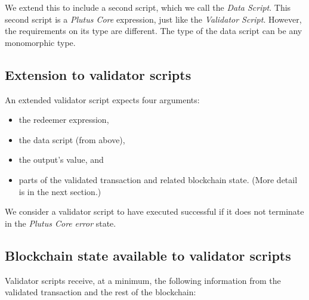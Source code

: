 \documentclass[11pt,a4paper]{article}
\begin{document}
We extend this to include a second script, which we call the \emph{Data Script}.
This second script is a \emph{Plutus Core} expression, just like the \emph{Validator Script}.
However, the requirements on its type are different.
The type of the data script can be any monomorphic type.

\subsection{Extension to validator scripts}

An extended validator script expects four arguments:

\begin{itemize}
\item the redeemer expression,
\item the data script (from above),
\item the output’s value, and
\item parts of the validated transaction and related blockchain state. (More detail is in the next section.)
\end{itemize}

\begin{figure}[!h]
\centering
{}
\end{figure}

We consider a validator script to have executed successful
if it does not terminate in the \emph{Plutus Core} \emph{error} state.

\subsection{Blockchain state available to validator scripts}

Validator scripts receive, at a minimum, the following information from the validated transaction
and the rest of the blockchain:
\end{document}

